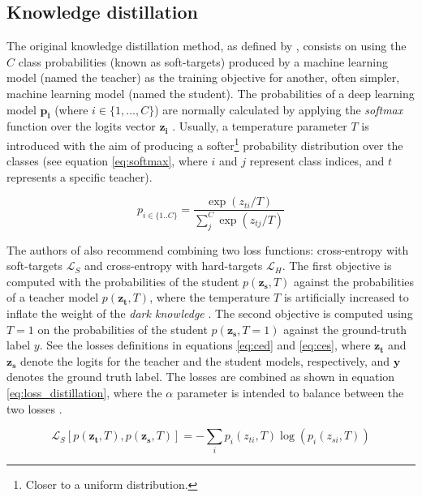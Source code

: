  \subsection{Knowledge distillation} \label{sec:distillation_kd}
 The original knowledge distillation method, as defined by \autocite{hinton2015}, consists on using the $C$ class probabilities (known as soft-targets) produced by a machine learning model (named the teacher) as the training objective for another, often simpler, machine learning model (named the student). The probabilities of a deep learning model $\mathbf{p_i}$ (where $i \in \{1,...,C\}$) are normally calculated by applying the \textit{softmax} function over the logits vector $\mathbf{z_i}$ \autocite{Goodfellow2016}. Usually, a temperature parameter $T$ is introduced with the aim of producing a softer\footnote{Closer to a uniform distribution.} probability distribution over the classes (see equation \ref{eq:softmax}, where $i$ and $j$ represent class indices, and $t$ represents a specific teacher).

 \begin{equation}
 p_{i \in \{1 .. C\}} = \frac{\exp(z_{ti}/T)}{\sum_j^C \exp(z_{tj}/T)}
 \label{eq:softmax}
 \end{equation}

 The authors of \autocite{hinton2015} also recommend combining two loss functions: cross-entropy with soft-targets $\mathcal{L}_S$ and cross-entropy with hard-targets  $\mathcal{L}_H$. The first objective is computed with the probabilities of the student $p( \mathbf{z_s}, T)$ against the probabilities of a teacher model $p( \mathbf{z_t}, T)$, where the temperature $T$ is artificially increased to inflate the weight of the \textit{dark knowledge} \autocite{hinton2015}. The second objective is computed using  $T=1$ on the probabilities of the student $p( \mathbf{z_s}, T=1)$ against the ground-truth label $y$. See the losses definitions in equations \ref{eq:ced} and \ref{eq:ces}, where $\mathbf{z_t}$ and $\mathbf{z_s}$ denote the logits for the teacher and the student models, respectively, and $\mathbf{y}$ denotes the ground truth label. The losses are combined as shown in equation \ref{eq:loss_distillation}, where the $\alpha$ parameter is intended to balance between the two losses \autocite{gou2020}.

 \begin{equation}
 \mathcal{L}_S\left[p( \mathbf{z_t}, T), p(\mathbf{z_s}, T) \right] = -\sum_i p_i(z_{ti}, T) \log \left(p_i(z_{si}, T)\right)
 \label{eq:ced}
 \end{equation}

